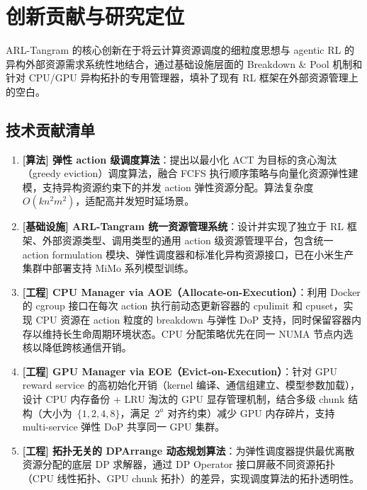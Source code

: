 \documentclass[11pt, a4paper]{article}
\begin{document}
\section{创新贡献与研究定位}

\begin{keyinsight}[TL;DR]
ARL-Tangram 的核心创新在于将云计算资源调度的细粒度思想与 agentic RL 的异构外部资源需求系统性地结合，通过基础设施层面的 Breakdown \& Pool 机制和针对 CPU/GPU 异构拓扑的专用管理器，填补了现有 RL 框架在外部资源管理上的空白。
\end{keyinsight}

\subsection{技术贡献清单}

\begin{enumerate}
  \item \textbf{[算法] 弹性 action 级调度算法}：提出以最小化 ACT 为目标的贪心淘汰（greedy eviction）调度算法，融合 FCFS 执行顺序策略与向量化资源弹性建模，支持异构资源约束下的并发 action 弹性资源分配。算法复杂度~$O(kn^2m^2)$，适配高并发短时延场景。

  \item \textbf{[基础设施] ARL-Tangram 统一资源管理系统}：设计并实现了独立于 RL 框架、外部资源类型、调用类型的通用 action 级资源管理平台，包含统一 action formulation 模块、弹性调度器和标准化异构资源接口，已在小米生产集群中部署支持 MiMo 系列模型训练。

  \item \textbf{[工程] CPU Manager via AOE（Allocate-on-Execution）}：利用 Docker 的 cgroup 接口在每次 action 执行前动态更新容器的 cpulimit 和 cpuset，实现 CPU 资源在 action 粒度的 breakdown 与弹性 DoP 支持，同时保留容器内存以维持长生命周期环境状态。CPU 分配策略优先在同一 NUMA 节点内选核以降低跨核通信开销。

  \item \textbf{[工程] GPU Manager via EOE（Evict-on-Execution）}：针对 GPU reward service 的高初始化开销（kernel 编译、通信组建立、模型参数加载），设计 CPU 内存备份 + LRU 淘汰的 GPU 显存管理机制，结合多级 chunk 结构（大小为~$\{1, 2, 4, 8\}$，满足~$2^a$ 对齐约束）减少 GPU 内存碎片，支持 multi-service 弹性 DoP 共享同一 GPU 集群。

  \item \textbf{[工程] 拓扑无关的 DPArrange 动态规划算法}：为弹性调度器提供最优离散资源分配的底层 DP 求解器，通过 DP Operator 接口屏蔽不同资源拓扑（CPU 线性拓扑、GPU chunk 拓扑）的差异，实现调度算法的拓扑透明性。
\end{enumerate}
\end{document}
